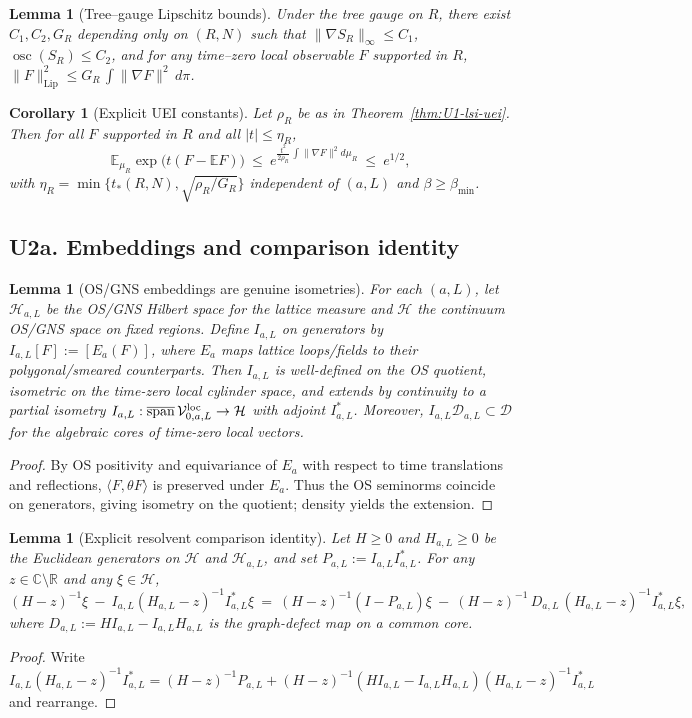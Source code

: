 \documentclass[11pt]{amsart}
\theoremstyle{plain}
\newtheorem{lemma}[theorem]{Lemma}
\newtheorem{corollary}[theorem]{Corollary}
\theoremstyle{definition}
\theoremstyle{remark}
\begin{document}
\begin{lemma}[Tree–gauge Lipschitz bounds]\label{lem:U1-tree-bounds}
Under the tree gauge on $R$, there exist $C_1,C_2,G_R$ depending only on $(R,N)$ such that $\|\nabla S_R\|_{\infty}\le C_1$, $\operatorname{osc}(S_R)\le C_2$, and for any time–zero local observable $F$ supported in $R$, $\|F\|_{\mathrm{Lip}}^2\le G_R\,\int \|\nabla F\|^2\,d\pi$.
\end{lemma}

\begin{corollary}[Explicit UEI constants]\label{cor:U1-uei}
Let $\rho_R$ be as in Theorem~\ref{thm:U1-lsi-uei}. Then for all $F$ supported in $R$ and all $|t|\le \eta_R$,
\[
  \mathbb E_{\mu_R}\exp\big(t(F-\mathbb E F)\big)\ \le\ e^{\tfrac{t^2}{2\rho_R}\,\int\|\nabla F\|^2 d\mu_R}\ \le\ e^{1/2},
\]
with $\eta_R=\min\{t_*(R,N),\sqrt{\rho_R/G_R}\}$ independent of $(a,L)$ and $\beta\ge \beta_{\min}$.
\end{corollary}

\subsection*{U2a. Embeddings and comparison identity}
\begin{lemma}[OS/GNS embeddings are genuine isometries]\label{lem:U2-embeddings}
For each $(a,L)$, let $\mathcal H_{a,L}$ be the OS/GNS Hilbert space for the lattice measure and $\mathcal H$ the continuum OS/GNS space on fixed regions. Define $I_{a,L}$ on generators by $I_{a,L}[F]:=[E_a(F)]$, where $E_a$ maps lattice loops/fields to their polygonal/smeared counterparts. Then $I_{a,L}$ is well-defined on the OS quotient, isometric on the time-zero local cylinder space, and extends by continuity to a partial isometry $I_{a,L}:\overline{\mathrm{span}}\,\mathcal V^{\rm loc}_{0,a,L}\to\mathcal H$ with adjoint $I_{a,L}^*$. Moreover, $I_{a,L}\mathcal D_{a,L}\subset\mathcal D$ for the algebraic cores of time-zero local vectors.
\end{lemma}
\begin{proof}
By OS positivity and equivariance of $E_a$ with respect to time translations and reflections, $\langle F,\theta F\rangle$ is preserved under $E_a$. Thus the OS seminorms coincide on generators, giving isometry on the quotient; density yields the extension.
\end{proof}

\begin{lemma}[Explicit resolvent comparison identity]\label{lem:U2-comparison}
Let $H\ge 0$ and $H_{a,L}\ge 0$ be the Euclidean generators on $\mathcal H$ and $\mathcal H_{a,L}$, and set $P_{a,L}:=I_{a,L}I_{a,L}^*$. For any $z\in\mathbb C\setminus\mathbb R$ and any $\xi\in\mathcal H$,
\[
  (H-z)^{-1}\xi\ -\ I_{a,L}(H_{a,L}-z)^{-1}I_{a,L}^*\xi
  \
  =\ (H-z)^{-1}(I-P_{a,L})\xi\ -\ (H-z)^{-1}\,D_{a,L}\,(H_{a,L}-z)^{-1}I_{a,L}^*\xi,
\]
where $D_{a,L}:=H I_{a,L}-I_{a,L}H_{a,L}$ is the graph-defect map on a common core.
\end{lemma}
\begin{proof}
Write $I_{a,L}(H_{a,L}-z)^{-1}I_{a,L}^*=(H-z)^{-1}P_{a,L}+(H-z)^{-1}(HI_{a,L}-I_{a,L}H_{a,L})(H_{a,L}-z)^{-1}I_{a,L}^*$ and rearrange.
\end{proof}
\end{document}
